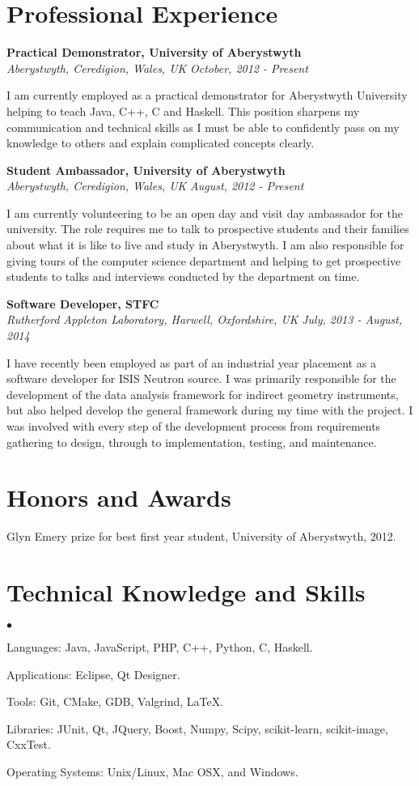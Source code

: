 \documentclass[margin,line]{res}
\newenvironment{list2}{
  \begin{list}{$\bullet$}{%
      \setlength{\itemsep}{0in}
      \setlength{\parsep}{0in} \setlength{\parskip}{0in}
      \setlength{\topsep}{0in} \setlength{\partopsep}{0in}
      \setlength{\leftmargin}{0.2in}}}{\end{list}}
\begin{document}
\begin{resume}
\section{\sc Professional Experience}
{\bf Practical Demonstrator, University of Aberystwyth} \\
{\it Aberystwyth, Ceredigion, Wales, UK} \hfill {\it  October, 2012 - Present}

I am currently employed as a practical demonstrator for Aberystwyth University helping to teach Java, C++, C and Haskell. This position sharpens my communication and technical skills as I must be able to confidently pass on my knowledge to others and explain complicated concepts clearly.

{\bf Student Ambassador, University of Aberystwyth}\\ 
{\it Aberystwyth, Ceredigion, Wales, UK} \hfill {\it August, 2012 - Present}

I am currently volunteering to be an open day and visit day ambassador for the university. The role requires me to talk to prospective students and their families about what it is like to live and study in Aberystwyth. I am also responsible for giving tours of the computer science department and helping to get prospective students to talks and interviews conducted by the department on time.

{\bf Software Developer, STFC} \\
{\it Rutherford Appleton Laboratory, Harwell, Oxfordshire, UK}  \hfill {\it July, 2013 - August, 2014}

I have recently been employed as part of an industrial year placement as a software developer for ISIS Neutron source. I was primarily responsible for the development of the data analysis framework for indirect geometry instruments, but also helped develop the general framework during my time with the project. I was involved with every step of the development process from requirements gathering to design, through to implementation, testing, and maintenance.

\section{\sc Honors and Awards}
Glyn Emery prize for best first year student, University of Aberystwyth, 2012.

\section{\sc Technical Knowledge and  Skills}
\begin{list2}
\item Languages: Java, JavaScript, PHP, C++, Python, C, Haskell.
\item Applications: Eclipse, Qt Designer.
\item Tools: Git, CMake, GDB, Valgrind, \LaTeX.
\item Libraries: JUnit, Qt, JQuery, Boost, Numpy, Scipy, scikit-learn, scikit-image, CxxTest.
\item Operating Systems:  Unix/Linux, Mac OSX, and Windows.\\
\end{list2}


\end{resume}
\end{document}
